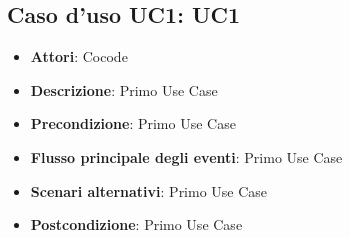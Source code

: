 \subsection{Caso d'uso \hypertarget{UC1}{UC1}: UC1}
\begin{itemize}
\item \textbf{Attori}: Cocode
\item \textbf{Descrizione}: Primo Use Case
\item \textbf{Precondizione}: Primo Use Case
\item \textbf{Flusso principale degli eventi}: Primo Use Case
\item \textbf{Scenari alternativi}: Primo Use Case
\item \textbf{Postcondizione}: Primo Use Case
\end{itemize}
